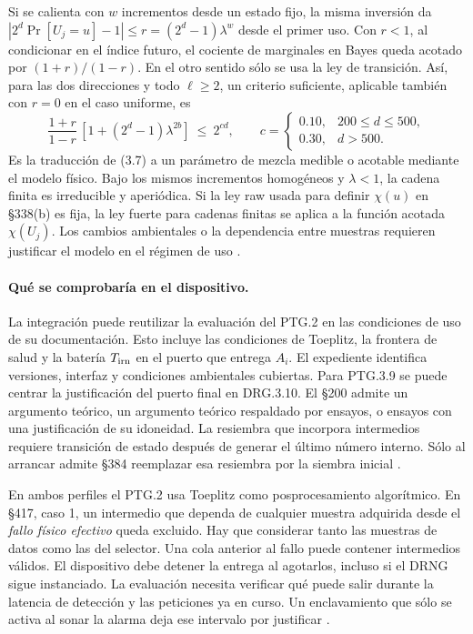 Si se calienta con $w$ incrementos desde un estado fijo, la misma inversión
da $|2^d\Pr[U_j=u]-1|\le r=(2^d-1)\lambda^w$ desde el primer uso.
Con $r<1$, al condicionar en el índice futuro, el cociente de marginales
en Bayes queda acotado por $(1+r)/(1-r)$. En el otro sentido sólo se usa
la ley de transición. Así, para las dos direcciones y todo $\ell\ge2$,
un criterio suficiente, aplicable también con $r=0$ en el caso uniforme,
es
\[
 \frac{1+r}{1-r}\,[1+(2^d-1)\lambda^{2b}]
 \ \le\ 2^{cd},\qquad
 c=\begin{cases}0.10,&200\le d\le500,\\0.30,&d>500.\end{cases}
\]
Es la traducción de (3.7) a un parámetro de mezcla medible o acotable
mediante el modelo físico. Bajo los mismos incrementos homogéneos y
$\lambda<1$, la cadena finita es irreducible y aperiódica. Si la ley raw
usada para definir $\chi(u)$ en §338(b) es fija, la ley fuerte para
cadenas finitas se aplica a la función acotada $\chi(U_j)$. Los cambios
ambientales o la dependencia entre muestras requieren justificar el
modelo en el régimen de uso \cite[§§338(b),(f), 951--955]{ais}.

\paragraph{Qué se comprobaría en el dispositivo.}
La integración puede reutilizar la evaluación del PTG.2 en las condiciones
de uso de su documentación. Esto incluye las condiciones de Toeplitz,
la frontera de salud y la batería $T_{\rm irn}$ en el puerto que entrega
$A_i$. El expediente identifica versiones, interfaz y condiciones
ambientales cubiertas. Para PTG.3.9 se puede centrar la justificación
del puerto final en DRG.3.10. El §200 admite un argumento teórico,
un argumento teórico respaldado por ensayos, o ensayos con una
justificación de su idoneidad. La resiembra que incorpora intermedios
requiere transición de estado después de generar el último número interno.
Sólo al arrancar admite §384 reemplazar esa resiembra por la siembra
inicial \cite[§§200,338,373,377,381,384,401,422--423]{ais}.

En ambos perfiles el PTG.2 usa Toeplitz como posprocesamiento algorítmico.
En §417, caso 1, un intermedio que dependa de cualquier muestra adquirida
desde el \emph{fallo físico efectivo} queda excluido. Hay que considerar
tanto las muestras de datos como las del selector. Una cola anterior
al fallo puede contener intermedios válidos. El dispositivo debe
detener la entrega al agotarlos, incluso si el DRNG sigue instanciado.
La evaluación necesita verificar qué puede salir durante la latencia
de detección y las peticiones ya en curso. Un enclavamiento que sólo
se activa al sonar la alarma deja ese intervalo por justificar
\cite[§§327 (PTG.2.5),364,375 (PTG.3.8),415--418]{ais}.
